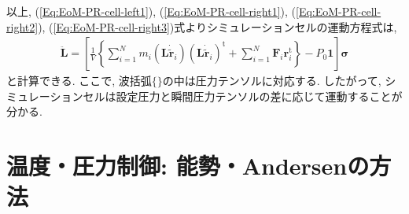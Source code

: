 以上, (\ref{Eq:EoM-PR-cell-left1}), (\ref{Eq:EoM-PR-cell-right1}), (\ref{Eq:EoM-PR-cell-right2}), (\ref{Eq:EoM-PR-cell-right3})式よりシミュレーションセルの運動方程式は, 
\begin{align}
\ddot{\bm{L}} =
\left[
  \frac{1}{V}
  \left\{
    \sum_{i=1}^{N} m_{i}
    (\bm{L}\dot{\tilde{\bm{r}}}_{i})
    (\bm{L}\dot{\tilde{\bm{r}}}_{i})^{\mathrm{t}}
    +
    \sum_{i=1}^{N}
    \bm{F}_{i} \bm{r}_{i}^{\mathrm{t}}
  \right\}
  - P_{0} \bm{1}
\right]
\bm{\sigma}
\end{align}
と計算できる. ここで, 波括弧$\{\}$の中は圧力テンソルに対応する. したがって, シミュレーションセルは設定圧力と瞬間圧力テンソルの差に応じて運動することが分かる.

\clearpage

\section{温度・圧力制御: 能勢・Andersenの方法}


